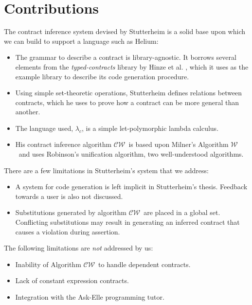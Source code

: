 \documentclass[10pt]{report}
\newcommand{\W}{$\mathcal{W}$}
\newcommand{\CW}{$\mathcal{CW}$}
\begin{document}
\chapter{Contributions}
\label{chapter-overview}

The contract inference system devised by Stutterheim is a solid base upon which we can build to support a language such as Helium:

\begin{itemize}
	\item The grammar to describe a contract is library-agnostic. It borrows several elements from the \textit{typed-contracts} library by Hinze et al. \cite{Hinze06typedcontracts}, which it uses as the example library to describe its code generation procedure.
	\item Using simple set-theoretic operations, Stutterheim defines relations between contracts, which he uses to prove how a contract can be more general than another.
	\item The language used, $\lambda_c$, is a simple let-polymorphic lambda calculus.
	\item His contract inference algorithm \CW ~is based upon Milner's Algorithm \W ~and uses Robinson's unification algorithm, two well-understood algorithms.
\end{itemize}

There are a few limitations in Stutterheim's system that we address:

\begin{itemize}
	\item A system for code generation is left implicit in Stutterheim's thesis. Feedback towards a user is also not discussed.
	\item Substitutions generated by algorithm \CW ~are placed in a global set. Conflicting substitutions may result in generating an inferred contract that causes a violation during assertion.
\end{itemize}

The following limitations are \textit{not} addressed by us:

\begin{itemize}
	\item Inability of Algorithm \CW ~to handle dependent contracts.
	\item Lack of constant expression contracts.
	\item Integration with the Ask-Elle programming tutor.
\end{itemize}
\end{document}
